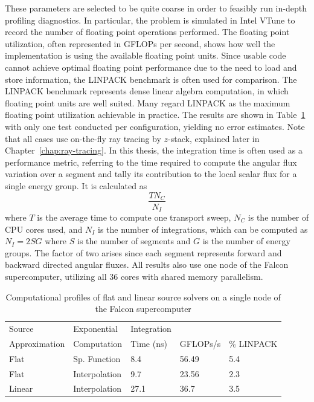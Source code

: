 These parameters are selected to be quite coarse in order to feasibly run in-depth profiling diagnostics. In particular, the problem is simulated in Intel VTune to record the number of floating point operations performed. The floating point utilization, often represented in G\acp{FLOP} per second, shows how well the implementation is using the available floating point units. Since usable code cannot achieve optimal floating point performance due to the need to load and store information, the LINPACK benchmark is often used for comparison. The LINPACK benchmark represents dense linear algebra computation, in which floating point units are well suited. Many regard LINPACK as the maximum floating point utilization achievable in practice. The results are shown in Table~\ref{tab:exp-performance} with only one test conducted per configuration, yielding no error estimates. Note that all cases use on-the-fly ray tracing by $z$-stack, explained later in Chapter~\ref{chap:ray-tracing}. In this thesis, the integration time is often used as a performance metric, referring to the time required to compute the angular flux variation over a segment and tally its contribution to the local scalar flux for a single energy group. It is calculated as 
\begin{equation*}
	\frac{T N_C}{N_I}
\end{equation*}
where $T$ is the average time to compute one transport sweep, $N_C$ is the number of CPU cores used, and $N_I$ is the number of integrations, which can be computed as $N_I = 2 S G$ where $S$ is the number of segments and $G$ is the number of energy groups. The factor of two arises since each segment represents forward and backward directed angular fluxes. All results also use one node of the Falcon supercomputer, utilizing all 36 cores with shared memory parallelism.

\begin{table}[ht]
	\centering
	\caption{Computational profiles of flat and linear source solvers on a single node of the Falcon supercomputer}
	\medskip
	\begin{tabular}{l|l|l|l|l}
		\hline
		Source & Exponential & Integration & & \\
		Approximation & Computation & Time (ns) & GFLOPs/s & \% LINPACK \\
		\hline
		Flat & Sp. Function & 8.4 & 56.49 & 5.4 \\
		Flat & Interpolation & 9.7 & 23.56 & 2.3 \\
		Linear & Interpolation & 27.1 & 36.7 & 3.5 \\
		\hline
	\end{tabular}
	\label{tab:exp-performance}
\end{table}

